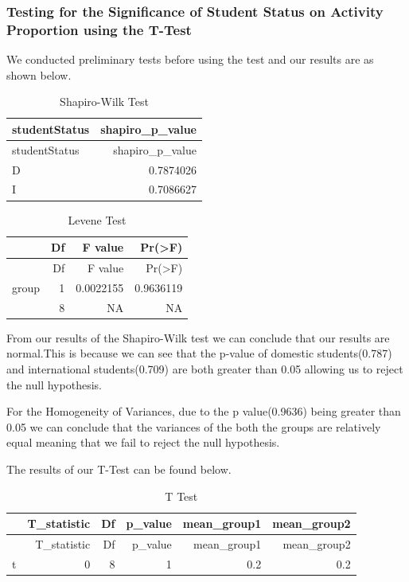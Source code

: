 \documentclass[
  letterpaper,
  DIV=11,
  numbers=noendperiod]{scrartcl}
\begin{document}
\subsubsection{Testing for the Significance of Student Status on
Activity Proportion using the
T-Test}\label{testing-for-the-significance-of-student-status-on-activity-proportion-using-the-t-test}

We conducted preliminary tests before using the test and our results are
as shown below.

\begin{longtable}[]{@{}lr@{}}
\caption{Shapiro-Wilk Test}\tabularnewline
\toprule\noalign{}
studentStatus & shapiro\_p\_value \\
\midrule\noalign{}
\endfirsthead
\toprule\noalign{}
studentStatus & shapiro\_p\_value \\
\midrule\noalign{}
\endhead
\bottomrule\noalign{}
\endlastfoot
D & 0.7874026 \\
I & 0.7086627 \\
\end{longtable}

\begin{longtable}[]{@{}lrrr@{}}
\caption{Levene Test}\tabularnewline
\toprule\noalign{}
& Df & F value & Pr(\textgreater F) \\
\midrule\noalign{}
\endfirsthead
\toprule\noalign{}
& Df & F value & Pr(\textgreater F) \\
\midrule\noalign{}
\endhead
\bottomrule\noalign{}
\endlastfoot
group & 1 & 0.0022155 & 0.9636119 \\
& 8 & NA & NA \\
\end{longtable}

From our results of the Shapiro-Wilk test we can conclude that our
results are normal.This is because we can see that the p-value of
domestic students(0.787) and international students(0.709) are both
greater than 0.05 allowing us to reject the null hypothesis.

For the Homogeneity of Variances, due to the p value(0.9636) being
greater than 0.05 we can conclude that the variances of the both the
groups are relatively equal meaning that we fail to reject the null
hypothesis.

The results of our T-Test can be found below.

\begin{longtable}[]{@{}lrrrrr@{}}
\caption{T Test}\tabularnewline
\toprule\noalign{}
& T\_statistic & Df & p\_value & mean\_group1 & mean\_group2 \\
\midrule\noalign{}
\endfirsthead
\toprule\noalign{}
& T\_statistic & Df & p\_value & mean\_group1 & mean\_group2 \\
\midrule\noalign{}
\endhead
\bottomrule\noalign{}
\endlastfoot
t & 0 & 8 & 1 & 0.2 & 0.2 \\
\end{longtable}
\end{document}
